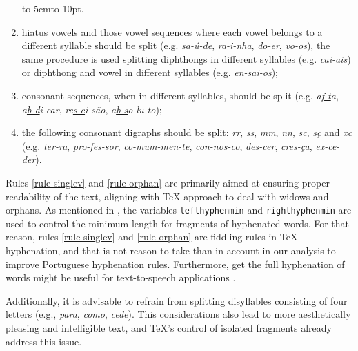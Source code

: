 \documentclass{article}
\begin{document}
\begin{enumerate}
    \hspace{10em} \hbox to 5cm{\leaders\hbox to 10pt{\hss . \hss}\hfil} 

    \item\label{rule-hiatus} hiatus vowels and those vowel sequences where each vowel
	belongs to a different syllable should be split (e.g.
	\emph{sa\underline{-ú-}de}, \emph{ra\underline{-i-}nha}, \emph{d\underline{o-e}r},
	\emph{v\underline{o-o}s}), the same procedure is used splitting diphthongs
	in different syllables (e.g. \emph{c\underline{ai-ai}s}) or diphthong and
	vowel in different syllables (e.g. \emph{en-s\underline{ai-o}s});
    \item\label{rule-consonants} consonant sequences, when in different syllables, should
	be split (e.g. \emph{a\underline{f-t}a}, \emph{a\underline{b-d}i-car},
	\emph{re\underline{s-c}i-são}, \emph{a\underline{b-s}o-lu-to});
    \item\label{rule-digraphs} the following consonant digraphs should be split:
	\emph{rr}, \emph{ss}, \emph{mm}, \emph{nn}, \emph{sc}, \emph{sç} and
	\emph{xc} (e.g. \emph{te\underline{r-r}a}, \emph{pro-fe\underline{s-s}or},
	\emph{co-mu\underline{\emph{m-m}}en-te}, \emph{co\underline{n-n}os-co},
	\emph{de\underline{s-c}er}, \emph{cre\underline{s-ç}a}, \emph{e\underline{x-c}e-der}).
\end{enumerate}

Rules \ref{rule-singlev} and \ref{rule-orphan} are primarily aimed at ensuring
proper readability of the text, aligning with \TeX{} approach to deal with
widows and orphans. As mentioned in , the variables
\verb|lefthyphenmin| and \verb|righthyphenmin| are used to control the minimum
length for fragments of hyphenated words. For that reason, rules
\ref{rule-singlev} and \ref{rule-orphan} are fiddling rules in \TeX{}
hyphenation, and that is not reason to take than in account in our analysis to
improve Portuguese hyphenation rules. Furthermore, get the full hyphenation of
words might be useful for text-to-speech applications \cite{libossek2000,trogkanis2010}.

Additionally, it is advisable to refrain from
splitting disyllables consisting of four letters (e.g., \emph{para},
\emph{como}, \emph{cede}). This considerations also lead to more aesthetically
pleasing and intelligible text, and \TeX{}'s control of isolated fragments already
address this issue.

\end{document}
